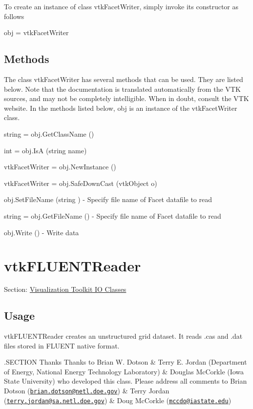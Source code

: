 To create an instance of class vtk\-Facet\-Writer, simply invoke its constructor as follows \begin{DoxyVerb}  obj = vtkFacetWriter
\end{DoxyVerb}
 \hypertarget{vtkwidgets_vtkxyplotwidget_Methods}{}\subsection{Methods}\label{vtkwidgets_vtkxyplotwidget_Methods}
The class vtk\-Facet\-Writer has several methods that can be used. They are listed below. Note that the documentation is translated automatically from the V\-T\-K sources, and may not be completely intelligible. When in doubt, consult the V\-T\-K website. In the methods listed below, {\ttfamily obj} is an instance of the vtk\-Facet\-Writer class. 
\begin{DoxyItemize}
\item {\ttfamily string = obj.\-Get\-Class\-Name ()}  
\item {\ttfamily int = obj.\-Is\-A (string name)}  
\item {\ttfamily vtk\-Facet\-Writer = obj.\-New\-Instance ()}  
\item {\ttfamily vtk\-Facet\-Writer = obj.\-Safe\-Down\-Cast (vtk\-Object o)}  
\item {\ttfamily obj.\-Set\-File\-Name (string )} -\/ Specify file name of Facet datafile to read  
\item {\ttfamily string = obj.\-Get\-File\-Name ()} -\/ Specify file name of Facet datafile to read  
\item {\ttfamily obj.\-Write ()} -\/ Write data  
\end{DoxyItemize}\hypertarget{vtkio_vtkfluentreader}{}\section{vtk\-F\-L\-U\-E\-N\-T\-Reader}\label{vtkio_vtkfluentreader}
Section\-: \hyperlink{sec_vtkio}{Visualization Toolkit I\-O Classes} \hypertarget{vtkwidgets_vtkxyplotwidget_Usage}{}\subsection{Usage}\label{vtkwidgets_vtkxyplotwidget_Usage}
vtk\-F\-L\-U\-E\-N\-T\-Reader creates an unstructured grid dataset. It reads .cas and .dat files stored in F\-L\-U\-E\-N\-T native format.

.S\-E\-C\-T\-I\-O\-N Thanks Thanks to Brian W. Dotson \& Terry E. Jordan (Department of Energy, National Energy Technology Laboratory) \& Douglas Mc\-Corkle (Iowa State University) who developed this class. Please address all comments to Brian Dotson (\href{mailto:brian.dotson@netl.doe.gov}{\tt brian.\-dotson@netl.\-doe.\-gov}) \& Terry Jordan (\href{mailto:terry.jordan@sa.netl.doe.gov}{\tt terry.\-jordan@sa.\-netl.\-doe.\-gov}) \& Doug Mc\-Corkle (\href{mailto:mccdo@iastate.edu}{\tt mccdo@iastate.\-edu})

